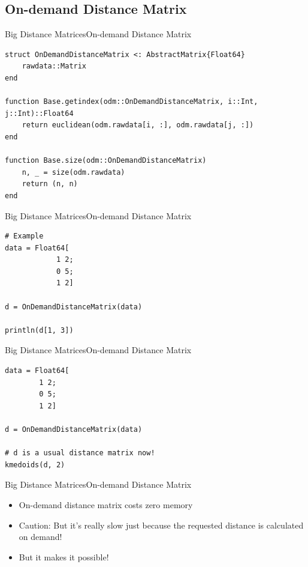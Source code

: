 \documentclass[11pt]{beamer}
\begin{document}
\subsection{On-demand Distance Matrix}
\begin{frame}[fragile]{Big Distance Matrices}{On-demand Distance Matrix}
\begin{lstlisting}[basicstyle=\tiny]
struct OnDemandDistanceMatrix <: AbstractMatrix{Float64}
	rawdata::Matrix
end

function Base.getindex(odm::OnDemandDistanceMatrix, i::Int, j::Int)::Float64
	return euclidean(odm.rawdata[i, :], odm.rawdata[j, :])
end 

function Base.size(odm::OnDemandDistanceMatrix)
	n, _ = size(odm.rawdata)
	return (n, n)
end 
\end{lstlisting}
\end{frame} 


\begin{frame}[fragile]{Big Distance Matrices}{On-demand Distance Matrix}
\begin{lstlisting}
# Example 
data = Float64[
			1 2; 
			0 5; 
			1 2]

d = OnDemandDistanceMatrix(data)

println(d[1, 3])	
\end{lstlisting}
\end{frame} 


\begin{frame}[fragile]{Big Distance Matrices}{On-demand Distance Matrix}
\begin{lstlisting}
data = Float64[
		1 2; 
		0 5; 
		1 2]
		
d = OnDemandDistanceMatrix(data)
		
# d is a usual distance matrix now!
kmedoids(d, 2)	
\end{lstlisting}
\end{frame} 


\begin{frame}[fragile]{Big Distance Matrices}{On-demand Distance Matrix}
\begin{itemize}
	\item On-demand distance matrix costs zero memory
	\item Caution: But it's really slow just because the requested distance is calculated on demand!
	\item But it makes it possible! \Winkey
\end{itemize}
\end{frame} 
\end{document}
